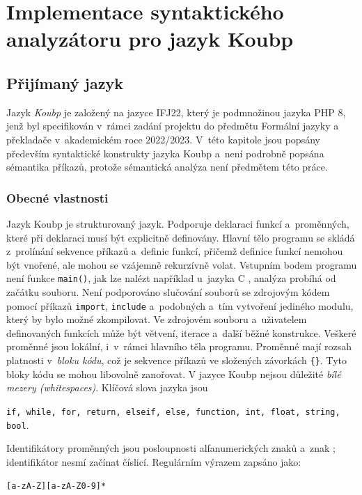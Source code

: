 \chapter{Implementace syntaktického analyzátoru pro jazyk Koubp}\label{kap_implementace}

\section{Přijímaný jazyk}\label{kap_prijimany_jazyk}

Jazyk \emph{Koubp} je založený na jazyce IFJ22, který je podmnožinou jazyka PHP 8, jenž byl specifikován v~rámci zadání projektu do předmětu Formální jazyky a překladače v~akademickém roce 2022/2023.
V~této kapitole jsou popsány především syntaktické konstrukty jazyka Koubp a~není podrobně popsána sémantika příkazů, protože sémantická analýza není předmětem této práce.

\subsection*{Obecné vlastnosti}
Jazyk Koubp je strukturovaný jazyk.
Podporuje deklaraci funkcí a~proměnných, které při deklaraci musí být explicitně definovány.
Hlavní tělo programu se skládá z~prolínání sekvence příkazů a~definic funkcí, přičemž definice funkcí nemohou být vnořené, ale mohou se vzájemně rekurzívně volat.
Vstupním bodem programu není funkce \texttt{main()}, jak lze nalézt například u~jazyka C \cite{ISO-C-Standard}, analýza probíhá od začátku souboru.
Není podporováno slučování souborů se zdrojovým kódem pomocí příkazů \texttt{import}, \texttt{include} a~podobných a~tím vytvoření jediného modulu, který by bylo možné zkompilovat.
Ve zdrojovém souboru a~uživatelem definovaných funkcích může být větvení, iterace a~další běžné konstrukce.
Veškeré proměnné jsou lokální, i~v~rámci hlavního těla programu.
Proměnné mají rozsah platnosti v~\emph{bloku kódu}, což je sekvence příkazů ve složených závorkách \texttt{\{\}}.
Tyto bloky kódu se mohou libovolně zanořovat.
V jazyce Koubp nejsou důležité \emph{bílé mezery (whitespaces)}.
Klíčová slova jazyka jsou
\begin{center}
    \texttt{if, while, for, return, elseif, else, function, int, float, string, bool}.
\end{center}

Identifikátory proměnných jsou posloupnosti alfanumerických znaků a~znak \texttt{\textunderscore}; identifikátor nesmí začínat číslicí.
Regulárním výrazem zapsáno jako:
\begin{center}
    \texttt{[a-zA-Z\textunderscore][a-zA-Z0-9\textunderscore]*}
\end{center}

